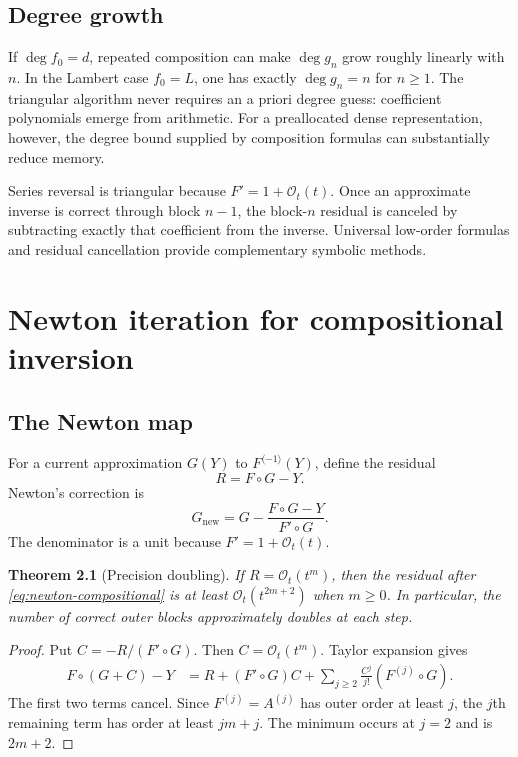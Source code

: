 \documentclass[11pt,oneside]{book}
\newtheorem{theorem}{Theorem}[chapter]
\theoremstyle{definition}
\theoremstyle{remark}
\newcommand{\bigO}{\mathcal O}
\newcommand{\compinv}{^{\langle-1\rangle}}
\newcommand{\compose}{\mathbin{\circ}}
\begin{document}
\section{Degree growth}
If $\deg f_0=d$, repeated composition can make $\deg g_n$ grow roughly
linearly with $n$.  In the Lambert case $f_0=L$, one has exactly
$\deg g_n=n$ for $n\ge1$.  The triangular algorithm never requires an a
priori degree guess: coefficient polynomials emerge from arithmetic.  For a
preallocated dense representation, however, the degree bound supplied by
composition formulas can substantially reduce memory.

\begin{summarybox}
Series reversal is triangular because $F'=1+\bigO_t(t)$.  Once an approximate
inverse is correct through block $n-1$, the block-$n$ residual is canceled by
subtracting exactly that coefficient from the inverse.  Universal low-order
formulas and residual cancellation provide complementary symbolic methods.
\end{summarybox}


\chapter{Newton iteration for compositional inversion}
\label{ch:reversion-newton}

\section{The Newton map}
For a current approximation $G(Y)$ to $F\compinv(Y)$, define the residual
\[
 R=F\compose G-Y.
\]
Newton's correction is
\begin{equation}\label{eq:newton-compositional}
 G_{\mathrm{new}}
 =G-\frac{F\compose G-Y}{F'\compose G}.
\end{equation}
The denominator is a unit because $F'=1+\bigO_t(t)$.

\begin{theorem}[Precision doubling]\label{thm:newton-doubling}
If $R=\bigO_t(t^m)$, then the residual after
\eqref{eq:newton-compositional} is at least
$\bigO_t(t^{2m+2})$ when $m\ge0$.  In particular, the number of correct outer
blocks approximately doubles at each step.
\end{theorem}
\begin{proof}
Put $C=-R/(F'\compose G)$.  Then $C=\bigO_t(t^m)$.  Taylor expansion gives
\begin{align*}
 F\compose(G+C)-Y
 &=R+(F'\compose G)C
 +\sum_{j\ge2}\frac{C^j}{j!}(F^{(j)}\compose G).
\end{align*}
The first two terms cancel.  Since $F^{(j)}=A^{(j)}$ has outer order at least
$j$, the $j$th remaining term has order at least $jm+j$.  The minimum occurs
at $j=2$ and is $2m+2$.
\end{proof}
\end{document}
